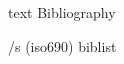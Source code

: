 





\bgroup
\let\_mtext\ignoreit
\nonum\chap Bibliography

\def\_opwarning#1{}
\usebib/s (iso690) biblist
\egroup

\bye
